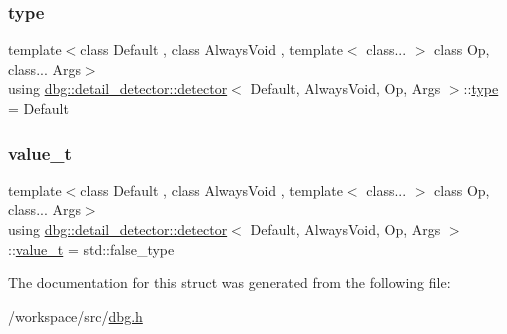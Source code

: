 \subsubsection{\texorpdfstring{type}{type}}
{\footnotesize\ttfamily template$<$class Default , class Always\+Void , template$<$ class... $>$ class Op, class... Args$>$ \\
using \hyperlink{structdbg_1_1detail__detector_1_1detector}{dbg\+::detail\+\_\+detector\+::detector}$<$ Default, Always\+Void, Op, Args $>$\+::\hyperlink{structdbg_1_1detail__detector_1_1detector_aab6b446944545683b9533ea8fc623480}{type} =  Default}

\mbox{\label{structdbg_1_1detail__detector_1_1detector_af1b6da4282d723669e926c52f446a989}} 
\subsubsection{\texorpdfstring{value\+\_\+t}{value\_t}}
{\footnotesize\ttfamily template$<$class Default , class Always\+Void , template$<$ class... $>$ class Op, class... Args$>$ \\
using \hyperlink{structdbg_1_1detail__detector_1_1detector}{dbg\+::detail\+\_\+detector\+::detector}$<$ Default, Always\+Void, Op, Args $>$\+::\hyperlink{structdbg_1_1detail__detector_1_1detector_af1b6da4282d723669e926c52f446a989}{value\+\_\+t} =  std\+::false\+\_\+type}



The documentation for this struct was generated from the following file\+:\begin{DoxyCompactItemize}
\item 
/workspace/src/\hyperlink{dbg_8h}{dbg.\+h}\end{DoxyCompactItemize}
